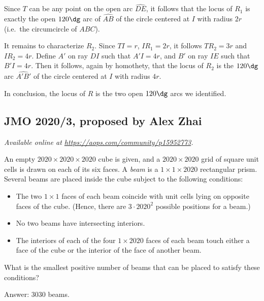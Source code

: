 \documentclass[11pt]{scrartcl}
\begin{document}
Since $T$ can be any point on the open arc $\widehat{DE}$,
it follows that the locus of $R_1$
is exactly the open $120\dg$ arc of $\widehat{AB}$
of the circle centered at $I$ with radius $2r$
(i.e.\ the circumcircle of $ABC$).

It remains to characterize $R_2$.
Since $TI = r$, $IR_1 = 2r$, it follows $TR_2 = 3r$ and $IR_2 = 4r$.
Define $A'$ on ray $DI$ such that $A'I = 4r$,
and $B'$ on ray $IE$ such that $B'I = 4r$.
Then it follows, again by homothety,
that the locus of $R_2$ is the $120\dg$ arc $\widehat{A'B'}$
of the circle centered at $I$ with radius $4r$.

In conclusion, the locus of $R$ is the two open $120\dg$ arcs we identified.
\pagebreak

\subsection{JMO 2020/3, proposed by Alex Zhai}
\textsl{Available online at \url{https://aops.com/community/p15952773}.}
\begin{mdframed}[style=mdpurplebox,frametitle={Problem statement}]
An empty $2020 \times 2020 \times 2020$ cube is given,
and a $2020 \times 2020$ grid of square unit cells is drawn on each of its six faces.
A \emph{beam} is a $1 \times 1 \times 2020$ rectangular prism.
Several beams are placed inside the cube subject to the following conditions:
\begin{itemize}
\item The two $1 \times 1$ faces of each beam coincide
  with unit cells lying on opposite faces of the cube.
  (Hence, there are $3 \cdot 2020^2$ possible positions for a beam.)
\item No two beams have intersecting interiors.
\item The interiors of each of the four $1 \times 2020$ faces of each beam touch
  either a face of the cube or the interior of the face of another beam.
\end{itemize}
What is the smallest positive number of beams that can be placed to satisfy these conditions?
\end{mdframed}
Answer: $3030$ beams.

\medskip
\end{document}

